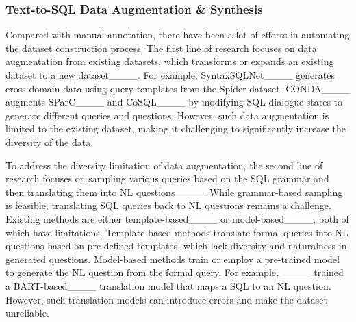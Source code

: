






\subsubsection{Text-to-SQL Data Augmentation \& Synthesis} Compared with manual annotation, there have been a lot of efforts in automating the dataset construction process. The first line of research focuses on data augmentation from existing datasets, which transforms or expands an existing dataset to a new dataset____.
For example, SyntaxSQLNet____ generates cross-domain data using query templates from the Spider dataset. CONDA____ augments SParC____ and CoSQL____ by modifying SQL dialogue states to generate different queries and questions.
However, such data augmentation is limited to the existing dataset, making it challenging to significantly increase the diversity of the data.

To address the diversity limitation of data augmentation, the second line of research focuses on  sampling various queries based on the SQL grammar and then translating them into NL questions____. 
While grammar-based sampling is feasible, translating SQL queries back to NL questions remains a challenge. Existing methods are either template-based____ or model-based____, both of which have limitations. Template-based methods translate formal queries into NL questions based on pre-defined templates, which lack diversity and naturalness in generated questions. Model-based methods train or employ a pre-trained model to generate the NL question from the formal query. 
For example, ____ trained a BART-based____ translation model that maps a SQL to an NL question. 
However, such translation models can introduce errors and make the dataset unreliable.

